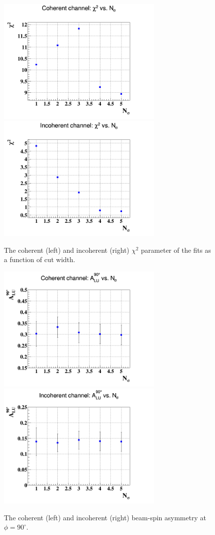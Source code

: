 \begin{figure}[tbp]
\includegraphics[height=6.2cm]{fig_dvcs/coh_chi2_Nsig.png}
\includegraphics[height=6.2cm]{fig_dvcs/incoh_chi2_Nsig.png}
   \caption{The coherent (left) and incoherent (right) $\chi^{2}$ parameter of
   the fits as a function of cut width.}
   \label{fig:sys_fit_chi2}
\end{figure}

 
\begin{figure}[tbp]
\includegraphics[height=6.2cm]{fig_dvcs/coh_Alu_Nsig.png}
\includegraphics[height=6.2cm]{fig_dvcs/incoh_Alu_Nsig.png}
   \caption{The coherent (left) and incoherent (right) 
      beam-spin asymmetry at
   $\phi = 90 ^{\circ}$. }
   \label{fig:sys_fit_Alu}
\end{figure}




